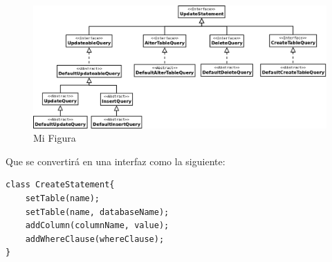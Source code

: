 \begin{figure}
  \centering
    \includegraphics[width=\textwidth]{figuras/crossdb-update.png}
  \caption{Mi Figura}
  \label{fig:update}
\end{figure}


Que se convertirá en una interfaz como la siguiente:


\begin{lstlisting}[title=Pseudocódigo interfaz para CREATE]
class CreateStatement{
	setTable(name);
	setTable(name, databaseName);
	addColumn(columnName, value);
	addWhereClause(whereClause);
}
\end{lstlisting}
